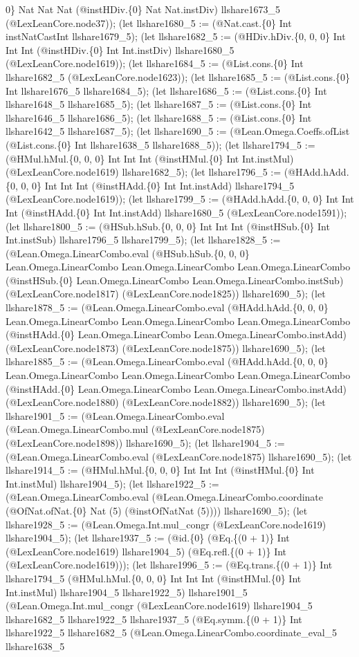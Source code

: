 \documentclass[11pt]{article}
\begin{document}
0\} Nat Nat Nat (@instHDiv.\{0\} Nat Nat.instDiv) llshare1673\_5 (@LexLeanCore.node37)); (let llshare1680\_5 := (@Nat.cast.\{0\} Int instNatCastInt llshare1679\_5); (let llshare1682\_5 := (@HDiv.hDiv.\{0, 0, 0\} Int Int Int (@instHDiv.\{0\} Int Int.instDiv) llshare1680\_5 (@LexLeanCore.node1619)); (let llshare1684\_5 := (@List.cons.\{0\} Int llshare1682\_5 (@LexLeanCore.node1623)); (let llshare1685\_5 := (@List.cons.\{0\} Int llshare1676\_5 llshare1684\_5); (let llshare1686\_5 := (@List.cons.\{0\} Int llshare1648\_5 llshare1685\_5); (let llshare1687\_5 := (@List.cons.\{0\} Int llshare1646\_5 llshare1686\_5); (let llshare1688\_5 := (@List.cons.\{0\} Int llshare1642\_5 llshare1687\_5); (let llshare1690\_5 := (@Lean.Omega.Coeffs.ofList (@List.cons.\{0\} Int llshare1638\_5 llshare1688\_5)); (let llshare1794\_5 := (@HMul.hMul.\{0, 0, 0\} Int Int Int (@instHMul.\{0\} Int Int.instMul) (@LexLeanCore.node1619) llshare1682\_5); (let llshare1796\_5 := (@HAdd.hAdd.\{0, 0, 0\} Int Int Int (@instHAdd.\{0\} Int Int.instAdd) llshare1794\_5 (@LexLeanCore.node1619)); (let llshare1799\_5 := (@HAdd.hAdd.\{0, 0, 0\} Int Int Int (@instHAdd.\{0\} Int Int.instAdd) llshare1680\_5 (@LexLeanCore.node1591)); (let llshare1800\_5 := (@HSub.hSub.\{0, 0, 0\} Int Int Int (@instHSub.\{0\} Int Int.instSub) llshare1796\_5 llshare1799\_5); (let llshare1828\_5 := (@Lean.Omega.LinearCombo.eval (@HSub.hSub.\{0, 0, 0\} Lean.Omega.LinearCombo Lean.Omega.LinearCombo Lean.Omega.LinearCombo (@instHSub.\{0\} Lean.Omega.LinearCombo Lean.Omega.LinearCombo.instSub) (@LexLeanCore.node1817) (@LexLeanCore.node1825)) llshare1690\_5); (let llshare1878\_5 := (@Lean.Omega.LinearCombo.eval (@HAdd.hAdd.\{0, 0, 0\} Lean.Omega.LinearCombo Lean.Omega.LinearCombo Lean.Omega.LinearCombo (@instHAdd.\{0\} Lean.Omega.LinearCombo Lean.Omega.LinearCombo.instAdd) (@LexLeanCore.node1873) (@LexLeanCore.node1875)) llshare1690\_5); (let llshare1885\_5 := (@Lean.Omega.LinearCombo.eval (@HAdd.hAdd.\{0, 0, 0\} Lean.Omega.LinearCombo Lean.Omega.LinearCombo Lean.Omega.LinearCombo (@instHAdd.\{0\} Lean.Omega.LinearCombo Lean.Omega.LinearCombo.instAdd) (@LexLeanCore.node1880) (@LexLeanCore.node1882)) llshare1690\_5); (let llshare1901\_5 := (@Lean.Omega.LinearCombo.eval (@Lean.Omega.LinearCombo.mul (@LexLeanCore.node1875) (@LexLeanCore.node1898)) llshare1690\_5); (let llshare1904\_5 := (@Lean.Omega.LinearCombo.eval (@LexLeanCore.node1875) llshare1690\_5); (let llshare1914\_5 := (@HMul.hMul.\{0, 0, 0\} Int Int Int (@instHMul.\{0\} Int Int.instMul) llshare1904\_5); (let llshare1922\_5 := (@Lean.Omega.LinearCombo.eval (@Lean.Omega.LinearCombo.coordinate (@OfNat.ofNat.\{0\} Nat (5) (@instOfNatNat (5)))) llshare1690\_5); (let llshare1928\_5 := (@Lean.Omega.Int.mul\_congr (@LexLeanCore.node1619) llshare1904\_5); (let llshare1937\_5 := (@id.\{0\} (@Eq.\{(0 + 1)\} Int (@LexLeanCore.node1619) llshare1904\_5) (@Eq.refl.\{(0 + 1)\} Int (@LexLeanCore.node1619))); (let llshare1996\_5 := (@Eq.trans.\{(0 + 1)\} Int llshare1794\_5 (@HMul.hMul.\{0, 0, 0\} Int Int Int (@instHMul.\{0\} Int Int.instMul) llshare1904\_5 llshare1922\_5) llshare1901\_5 (@Lean.Omega.Int.mul\_congr (@LexLeanCore.node1619) llshare1904\_5 llshare1682\_5 llshare1922\_5 llshare1937\_5 (@Eq.symm.\{(0 + 1)\} Int llshare1922\_5 llshare1682\_5 (@Lean.Omega.LinearCombo.coordinate\_eval\_5 llshare1638\_5 
\end{document}
